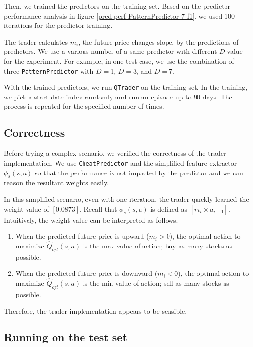 \documentclass[twocolumn,10pt]{asme2ej}
\begin{document}
Then, we trained the predictors on the training set. Based on the predictor
performance analysis in figure \ref{pred-perf-PatternPredictor-7-f1}, we used 100
iterations for the predictor training.

The trader calculates $m_i$, the future price changes slope, by the
predictions of predictors. We use a various number of a same predictor
with different $D$ value for the experiment. For example, in one test
case, we use the combination of three \verb|PatternPredictor| with
$D=1$, $D=3$, and $D=7$.

With the trained predictors, we run \verb|QTrader| on the training
set. In the training, we pick a start date index randomly and run an
episode up to 90 days. The process is repeated for the specified
number of times.

\subsection{Correctness}

Before trying a complex scenario, we verified the correctness of the
trader implementation. We use \verb|CheatPredictor| and the simplified
feature extractor $\phi_s(s,a)$ so that the performance is not
impacted by the predictor and we can reason the resultant weights
easily.

In this simplified scenario, even with one iteration, the trader
quickly learned the weight value of $[0.0873]$. Recall that
$\phi_s(s,a)$ is defined as $[m_i \times a_{i+1}]$. Intuitively, the
weight value can be interpreted as follows.

\begin{enumerate}
  \item When the predicted future price is upward ($m_i > 0$), the optimal
    action to maximize $\hat{Q}_{opt}(s, a)$ is the max value of action; buy as
    many stocks as possible.

  \item When the predicted future price is downward ($m_i < 0$), the optimal
    action to maximize $\hat{Q}_{opt}(s, a)$ is the min value of action; sell as
    many stocks as possible.
\end{enumerate}

Therefore, the trader implementation appears to be sensible.

\subsection{Running on the test set}
\end{document}

